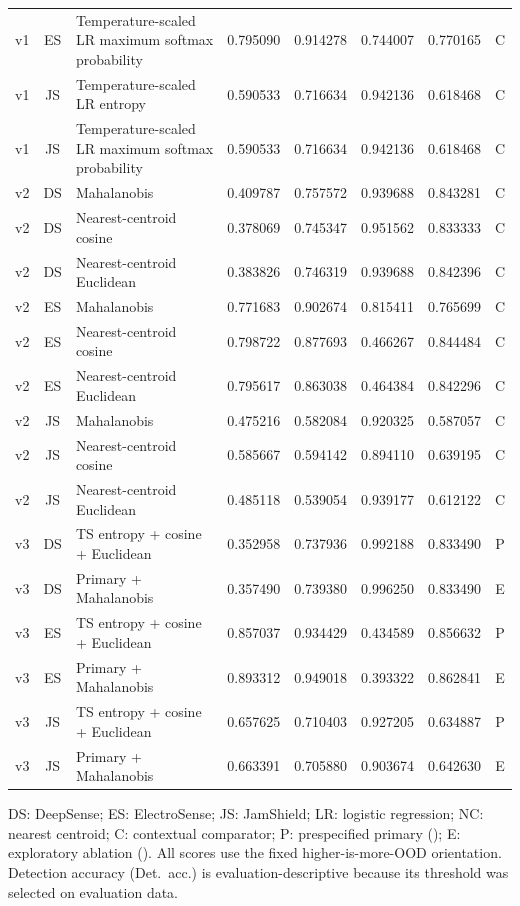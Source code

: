 \begin{table}[H]
\begin{tabularx}{\textwidth}{@{}c c Y r r r r c@{}}
    v1 & ES & Temperature-scaled LR maximum softmax probability & 0.795090 & 0.914278 & 0.744007 & 0.770165 & C \\
    v1 & JS & Temperature-scaled LR entropy & 0.590533 & 0.716634 & 0.942136 & 0.618468 & C \\
    v1 & JS & Temperature-scaled LR maximum softmax probability & 0.590533 & 0.716634 & 0.942136 & 0.618468 & C \\
    \addlinespace
    v2 & DS & Mahalanobis & 0.409787 & 0.757572 & 0.939688 & 0.843281 & C \\
    v2 & DS & Nearest-centroid cosine & 0.378069 & 0.745347 & 0.951562 & 0.833333 & C \\
    v2 & DS & Nearest-centroid Euclidean & 0.383826 & 0.746319 & 0.939688 & 0.842396 & C \\
    v2 & ES & Mahalanobis & 0.771683 & 0.902674 & 0.815411 & 0.765699 & C \\
    v2 & ES & Nearest-centroid cosine & 0.798722 & 0.877693 & 0.466267 & 0.844484 & C \\
    v2 & ES & Nearest-centroid Euclidean & 0.795617 & 0.863038 & 0.464384 & 0.842296 & C \\
    v2 & JS & Mahalanobis & 0.475216 & 0.582084 & 0.920325 & 0.587057 & C \\
    v2 & JS & Nearest-centroid cosine & 0.585667 & 0.594142 & 0.894110 & 0.639195 & C \\
    v2 & JS & Nearest-centroid Euclidean & 0.485118 & 0.539054 & 0.939177 & 0.612122 & C \\
    \addlinespace
    v3 & DS & TS entropy + cosine + Euclidean & 0.352958 & 0.737936 & 0.992188 & 0.833490 & P \\
    v3 & DS & Primary + Mahalanobis & 0.357490 & 0.739380 & 0.996250 & 0.833490 & E \\
    v3 & ES & TS entropy + cosine + Euclidean & 0.857037 & 0.934429 & 0.434589 & 0.856632 & P \\
    v3 & ES & Primary + Mahalanobis & 0.893312 & 0.949018 & 0.393322 & 0.862841 & E \\
    v3 & JS & TS entropy + cosine + Euclidean & 0.657625 & 0.710403 & 0.927205 & 0.634887 & P \\
    v3 & JS & Primary + Mahalanobis & 0.663391 & 0.705880 & 0.903674 & 0.642630 & E \\
    \bottomrule
  \end{tabularx}

  \vspace{2pt}
  \parbox{\textwidth}{\raggedright
  DS: DeepSense; ES: ElectroSense; JS: JamShield; LR: logistic regression; NC: nearest centroid; C: contextual comparator; P: prespecified primary (); E: exploratory ablation (). All scores use the fixed higher-is-more-OOD orientation. Detection accuracy (Det.\ acc.) is evaluation-descriptive because its threshold was selected on evaluation data.}
\end{table}
